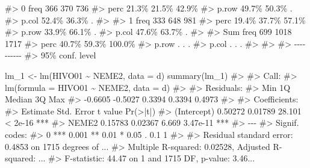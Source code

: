 \documentclass[
  letterpaper,
]{krantz}
\makeatletter
\newenvironment{Shaded}{\begin{snugshade}}{\end{snugshade}}
\newcommand{\AttributeTok}[1]{\textcolor[rgb]{0.40,0.45,0.13}{#1}}
\newcommand{\CommentTok}[1]{\textcolor[rgb]{0.37,0.37,0.37}{#1}}
\newcommand{\FunctionTok}[1]{\textcolor[rgb]{0.28,0.35,0.67}{#1}}
\newcommand{\NormalTok}[1]{\textcolor[rgb]{0.00,0.23,0.31}{#1}}
\newcommand{\OtherTok}[1]{\textcolor[rgb]{0.00,0.23,0.31}{#1}}
\newcommand{\SpecialCharTok}[1]{\textcolor[rgb]{0.37,0.37,0.37}{#1}}
\newenvironment{kframe}{%
\medskip{}
\setlength{\fboxsep}{.8em}
 \def\at@end@of@kframe{}%
 \ifinner\ifhmode%
  \def\at@end@of@kframe{\end{minipage}}%
  \begin{minipage}{\columnwidth}%
 \fi\fi%
 \def\FrameCommand##1{\hskip\@totalleftmargin \hskip-\fboxsep
 \colorbox{shadecolor}{##1}\hskip-\fboxsep
     \hskip-\linewidth \hskip-\@totalleftmargin \hskip\columnwidth}%
 \MakeFramed {\advance\hsize-\width
   \@totalleftmargin\z@ \linewidth\hsize
   \@setminipage}}%
 {\par\unskip\endMakeFramed%
 \at@end@of@kframe}
\renewenvironment{Shaded}{\begin{kframe}}{\end{kframe}}
\makeatother
\begin{document}
\begin{Shaded}
\begin{Highlighting}[]
\CommentTok{\#\textgreater{} 0       freq      366    370    736}
\CommentTok{\#\textgreater{}         perc    21.3\%  21.5\%  42.9\%}
\CommentTok{\#\textgreater{}         p.row   49.7\%  50.3\%      .}
\CommentTok{\#\textgreater{}         p.col   52.4\%  36.3\%      .}
\CommentTok{\#\textgreater{}                                    }
\CommentTok{\#\textgreater{} 1       freq      333    648    981}
\CommentTok{\#\textgreater{}         perc    19.4\%  37.7\%  57.1\%}
\CommentTok{\#\textgreater{}         p.row   33.9\%  66.1\%      .}
\CommentTok{\#\textgreater{}         p.col   47.6\%  63.7\%      .}
\CommentTok{\#\textgreater{}                                    }
\CommentTok{\#\textgreater{} Sum     freq      699  1\textquotesingle{}018  1\textquotesingle{}717}
\CommentTok{\#\textgreater{}         perc    40.7\%  59.3\% 100.0\%}
\CommentTok{\#\textgreater{}         p.row       .      .      .}
\CommentTok{\#\textgreater{}         p.col       .      .      .}
\CommentTok{\#\textgreater{}                                    }
\CommentTok{\#\textgreater{} }
\CommentTok{\#\textgreater{} {-}{-}{-}{-}{-}{-}{-}{-}{-}{-}}
\CommentTok{\#\textgreater{} \textquotesingle{} 95\% conf. level}
\end{Highlighting}
\end{Shaded}

\begin{Shaded}
\begin{Highlighting}[]
\NormalTok{lm\_1 }\OtherTok{\textless{}{-}} \FunctionTok{lm}\NormalTok{(HIVO01 }\SpecialCharTok{\textasciitilde{}}\NormalTok{ NEME2, }\AttributeTok{data =}\NormalTok{ d)}
\FunctionTok{summary}\NormalTok{(lm\_1)}
\CommentTok{\#\textgreater{} }
\CommentTok{\#\textgreater{} Call:}
\CommentTok{\#\textgreater{} lm(formula = HIVO01 \textasciitilde{} NEME2, data = d)}
\CommentTok{\#\textgreater{} }
\CommentTok{\#\textgreater{} Residuals:}
\CommentTok{\#\textgreater{}     Min      1Q  Median      3Q     Max }
\CommentTok{\#\textgreater{} {-}0.6605 {-}0.5027  0.3394  0.3394  0.4973 }
\CommentTok{\#\textgreater{} }
\CommentTok{\#\textgreater{} Coefficients:}
\CommentTok{\#\textgreater{}             Estimate Std. Error t value Pr(\textgreater{}|t|)    }
\CommentTok{\#\textgreater{} (Intercept)  0.50272    0.01789  28.101  \textless{} 2e{-}16 ***}
\CommentTok{\#\textgreater{} NEME2        0.15783    0.02367   6.669 3.47e{-}11 ***}
\CommentTok{\#\textgreater{} {-}{-}{-}}
\CommentTok{\#\textgreater{} Signif. codes:  }
\CommentTok{\#\textgreater{} 0 \textquotesingle{}***\textquotesingle{} 0.001 \textquotesingle{}**\textquotesingle{} 0.01 \textquotesingle{}*\textquotesingle{} 0.05 \textquotesingle{}.\textquotesingle{} 0.1 \textquotesingle{} \textquotesingle{} 1}
\CommentTok{\#\textgreater{} }
\CommentTok{\#\textgreater{} Residual standard error: 0.4853 on 1715 degrees of ...}
\CommentTok{\#\textgreater{} Multiple R{-}squared:  0.02528,    Adjusted R{-}squared:  ...}
\CommentTok{\#\textgreater{} F{-}statistic: 44.47 on 1 and 1715 DF,  p{-}value: 3.46...}
\end{Highlighting}
\end{Shaded}
\end{document}
